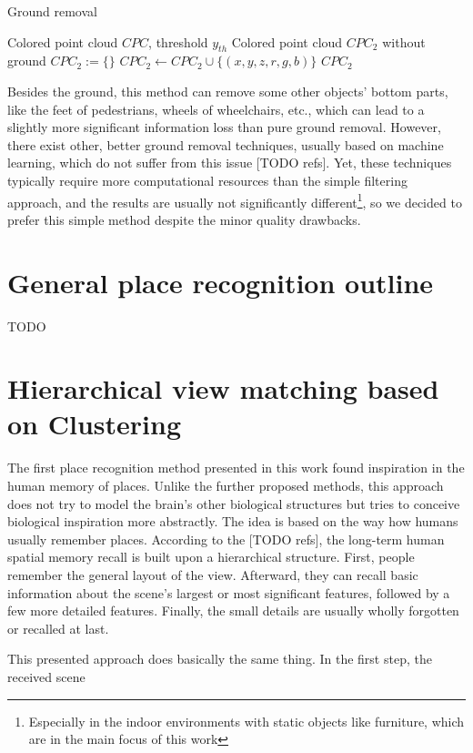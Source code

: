 \begin{algorithm}
    \caption{Ground removal}\label{alg:groundRemoval}
    \begin{algorithmic}
        \Require Colored point cloud $CPC$, threshold $y_{th}$
        \Ensure Colored point cloud $CPC_2$ without ground
        \State $CPC_2 := \{\}$  
         
         
        \State $CPC_2 \leftarrow CPC_2 \cup \{(x,y,z,r,g,b)\}$  
        \EndIf
        \EndFor
        \State\Return $CPC_2$
    \end{algorithmic}
\end{algorithm}

Besides the ground, this method can remove some other objects' bottom parts, like the feet of pedestrians, wheels of wheelchairs, etc., which can lead to a slightly more significant information loss than pure ground removal. However, there exist other, better ground removal techniques, usually based on machine learning, which do not suffer from this issue [TODO refs]. Yet, these techniques typically require more computational resources than the simple filtering approach, and the results are usually not significantly different\footnote{Especially in the indoor environments with static objects like furniture, which are in the main focus of this work}, so we decided to prefer this simple method despite the minor quality drawbacks.

\section{General place recognition outline}

TODO

\section{Hierarchical view matching based on Clustering}

The first place recognition method presented in this work found inspiration in the human memory of places. Unlike the further proposed methods, this approach does not try to model the brain's other biological structures but tries to conceive biological inspiration more abstractly. The idea is based on the way how humans usually remember places. According to the [TODO refs], the long-term human spatial memory recall is built upon a hierarchical structure. First, people remember the general layout of the view. Afterward, they can recall basic information about the scene's largest or most significant features, followed by a few more detailed features. Finally, the small details are usually wholly forgotten or recalled at last.\par
This presented approach does basically the same thing. In the first step, the received scene

